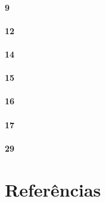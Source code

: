 \documentclass[
  11pt]{report}
\begin{document}
\hypertarget{section-12}{%
\subsubsection*{9}\label{section-12}}

\hypertarget{section-13}{%
\subsubsection*{12}\label{section-13}}

\hypertarget{section-14}{%
\subsubsection*{14}\label{section-14}}

\hypertarget{section-15}{%
\subsubsection*{15}\label{section-15}}

\hypertarget{section-16}{%
\subsubsection*{16}\label{section-16}}

\hypertarget{section-17}{%
\subsubsection*{17}\label{section-17}}

\hypertarget{section-18}{%
\subsubsection*{29}\label{section-18}}

\hypertarget{referuxeancias}{%
\chapter*{Referências}\label{referuxeancias}}
\end{document}
